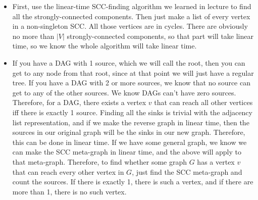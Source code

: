 \documentclass[11pt]{article}
\begin{document}
\begin{solution}
    \begin{itemize}
        \item First, use the linear-time SCC-finding algorithm we learned in lecture to find all the strongly-connected components. Then just make a list of every vertex in a non-singleton SCC. All those vertices are in cycles. There are obviously no more than $|V|$ strongly-connected components, so that part will take linear time, so we know the whole algorithm will take linear time.
        \item If you have a DAG with 1 source, which we will call the root, then you can get to any node from that root, since at that point we will just have a regular tree. If you have a DAG with 2 or more sources, we know that no source can get to any of the other sources. We know DAGs can't have zero sources. Therefore, for a DAG, there exists a vertex $v$ that can reach all other vertices iff there is exactly 1 source. Finding all the sinks is trivial with the adjacency list representation, and if we make the reverse graph in linear time, then the sources in our original graph will be the sinks in our new graph. Therefore, this can be done in linear time. If we have some general graph, we know we can make the SCC meta-graph in linear time, and the above will apply to that meta-graph. Therefore, to find whether some graph $G$ has a vertex $v$ that can reach every other vertex in $G$, just find the SCC meta-graph and count the sources. If there is exactly 1, there is such a vertex, and if there are more than 1, there is no such vertex.
    \end{itemize}
\end{solution}

\end{document}
